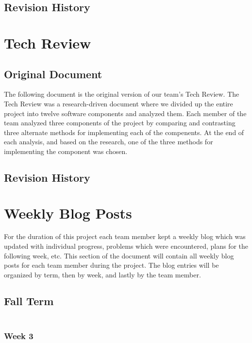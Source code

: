 \documentclass[10pt,letterpaper,onecolumn,draftclsnofoot,journal]{IEEEtran}
\begin{document}
\subsection{\textbf{Revision History}}



\section{\textbf{Tech Review}}
\subsection{\textbf{Original Document}}
The following document is the original version of our team's Tech Review. The Tech Review was a research-driven document where we divided up the entire project into twelve software components and analyzed them. Each member of the team analyzed three components of the project by comparing and contrasting three alternate methods for implementing each of the compenents. At the end of each analysis, and based on the research, one of the three methods for implementing the component was chosen. 


\subsection{\textbf{Revision History}}



\section{\textbf{Weekly Blog Posts}}
For the duration of this project each team member kept a weekly blog which was updated with individual progress, problems which were encountered, plans for the following week, etc. This section of the document will contain all weekly blog posts for each team member during the project. The blog entries will be organized by term, then by week, and lastly by the team member.
\subsection{\textbf{Fall Term}}
\subsubsection*{\textbf{\\Week 3}}
\end{document}
